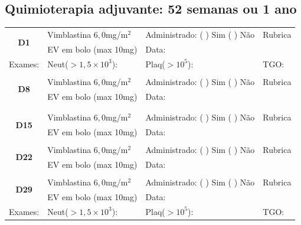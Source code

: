 \documentclass[11pt,a4paper,oldfontcommands]{memoir}
\begin{document}
\hfill\\

\hfill  {}\\

\subsection{Quimioterapia adjuvante: 52 semanas ou 1 ano}
\begin{center}
\begin{longtable}{p{1cm}p{5cm}|p{5cm}|p{3cm}}
    \hline
    \multicolumn{1}{c|}{\multirow{2}{*}{\textbf{D1}}}&{Vimblastina \(6,0\)mg/m\(^2\)}&{Administrado: (  ) Sim (  ) Não}&{Rubrica}\\
    \multicolumn{1}{c|}{}&{EV em bolo (max 10mg)}&{Data:}&\\
    \hline
    {\tiny{Exames:}}&{\tiny{Neut(\(>1,5\times10^3\)):}}&{\tiny{Plaq(\(>10^5\)):}}&{\tiny{TGO:}}
    \\
    \hline
    \\
    \hline
    \multicolumn{1}{c|}{\multirow{2}{*}{\textbf{D8}}}&{Vimblastina \(6,0\)mg/m\(^2\)}&{Administrado: (  ) Sim (  ) Não}&{Rubrica}\\
    \multicolumn{1}{c|}{}&{EV em bolo (max 10mg)}&{Data:}&\\
    \hline\\
    \\
    \hline
    \multicolumn{1}{c|}{\multirow{2}{*}{\textbf{D15}}}&{Vimblastina \(6,0\)mg/m\(^2\)}&{Administrado: (  ) Sim (  ) Não}&{Rubrica}\\
    \multicolumn{1}{c|}{}&{EV em bolo (max 10mg)}&{Data:}&\\
    \hline
    \\
    \hline
    \multicolumn{1}{c|}{\multirow{2}{*}{\textbf{D22}}}&{Vimblastina \(6,0\)mg/m\(^2\)}&{Administrado: (  ) Sim (  ) Não}&{Rubrica}\\
    \multicolumn{1}{c|}{}&{EV em bolo (max 10mg)}&{Data:}&\\
    \hline
    \\
    \hline
    \multicolumn{1}{c|}{\multirow{2}{*}{\textbf{D29}}}&{Vimblastina \(6,0\)mg/m\(^2\)}&{Administrado: (  ) Sim (  ) Não}&{Rubrica}\\
    \multicolumn{1}{c|}{}&{EV em bolo (max 10mg)}&{Data:}&\\
    \hline
    {\tiny{Exames:}}&{\tiny{Neut(\(>1,5\times10^3\)):}}&{\tiny{Plaq(\(>10^5\)):}}&{\tiny{TGO:}}

\end{longtable}
\end{center}
\end{document}
